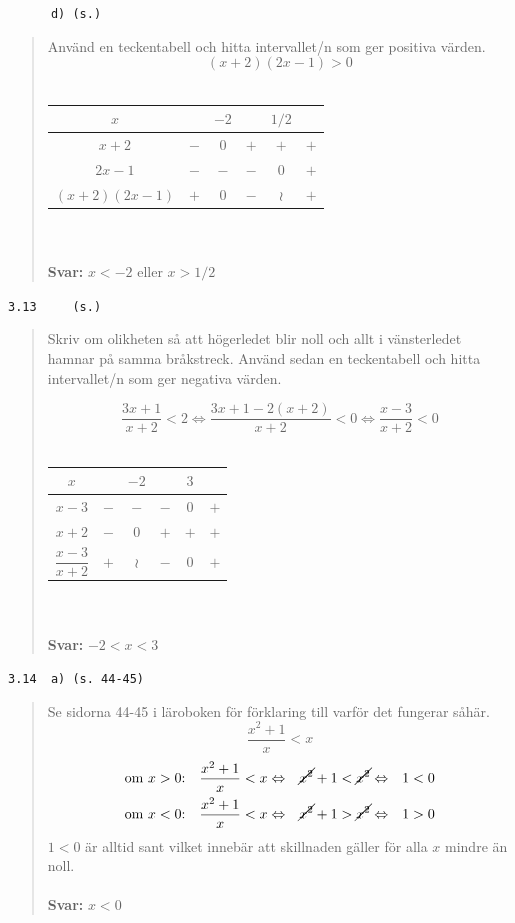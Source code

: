 \documentclass[a4paper]{article}
\newcommand{\tskcol}[1]{\textcolor{tskcol}{#1}}
\begin{document}
	\texttt{\tskcol{~~~~~~d) (s.)}}
	\begin{quotation}
		\noindent
		Använd en teckentabell och hitta intervallet/n som ger positiva värden.
		\[(x+2)(2x-1) > 0\] \\
		\begin{tabular}{c|c|c|c|c|c}
			$x$ & & $-2$ & & $1/2$ & \\ \hline
			$x+2$         & $-$ & $0$ & $+$ & $+$ & $+$ \\
			$2x-1$        & $-$ & $-$ & $-$ & $0$ & $+$ \\ \hline
			$(x+2)(2x-1)$ & $+$ & $0$ & $-$ &$\wr$& $+$ 
		\end{tabular}
		\\ \\
		\textbf{Svar:} $x<-2$ eller $x>1/2$
	\end{quotation}
	
	\pagebreak
	\texttt{\tskcol{3.13~~~~ (s.)}}
	\begin{quotation}
		\noindent
		Skriv om olikheten så att högerledet blir noll och allt i vänsterledet hamnar på samma bråkstreck. Använd sedan en teckentabell och hitta intervallet/n som ger negativa värden.
		
		\[\dfrac{3x+1}{x+2}<2 \Leftrightarrow
		\dfrac{3x+1-2(x+2)}{x+2}<0 \Leftrightarrow
		\dfrac{x-3}{x+2}<0\] \\
		\begin{tabular}{c|c|c|c|c|c}
			$x$ & & $-2$ & & $3$ & \\ \hline
			$x-3$              & $-$ & $-$ & $-$ & $0$ & $+$ \\
			$x+2$              & $-$ & $0$ & $+$ & $+$ & $+$ \\ \hline
			$\dfrac{x-3}{x+2}$ & $+$ &$\wr$& $-$ & $0$ & $+$ 
		\end{tabular}
		\\ \\
		\textbf{Svar:} $-2<x<3$
	\end{quotation}
	
	\texttt{\tskcol{3.14~~a) (s. 44-45)}}
	\begin{quotation}
		\noindent
		Se sidorna 44-45 i läroboken för förklaring till varför det fungerar såhär.
		\[\dfrac{x^2+1}{x}<x\]
		\begin{align*}
		&\text{om } x>0\text{:} &\dfrac{x^2+1}{x}<x &\Leftrightarrow &\cancel{x^2}+1<\cancel{x^2} &\Leftrightarrow &1<0 \\
		&\text{om } x<0\text{:} &\dfrac{x^2+1}{x}<x &\Leftrightarrow &\cancel{x^2}+1>\cancel{x^2} &\Leftrightarrow &1>0
		\end{align*}
		$1<0$ är alltid sant vilket innebär att skillnaden gäller för alla $x$ mindre än noll.
		\\ \\
		\textbf{Svar:} $x<0$ 
	\end{quotation}
	
\end{document}
